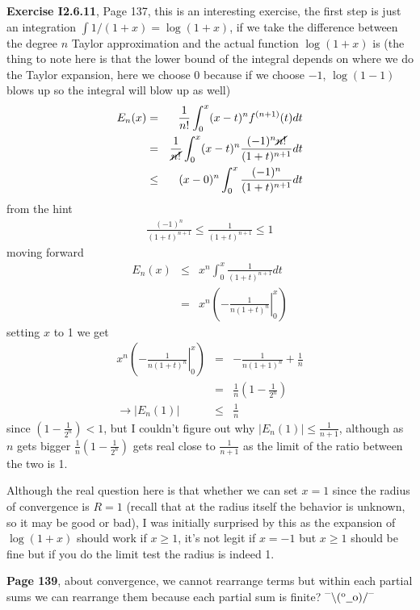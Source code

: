 \documentclass[aps,preprint,preprintnumbers,nofootinbib,showpacs,prd]{revtex4-1}
\newcommand{\nbea}{\begin{eqnarray*}}
\newcommand{\neea}{\end{eqnarray*}}
\newcommand{\dunno}{$ {}^{\mbox {--}}\backslash(^{\rm o}{}\underline{\hspace{0.2cm}}{\rm o})/^{\mbox {--}}$}
\begin{document}
{\bf Exercise I2.6.11}, Page 137, this is an interesting exercise, the first step is just an integration $\int 1/(1+x) = \log(1+x)$, if we take the difference between the degree $n$ Taylor approximation and the actual function $\log(1+x)$ is (the thing to note here is that the lower bound of the integral depends on where we do the Taylor expansion, here we choose 0 because if we choose $-1$, $\log(1-1)$ blows up so the integral will blow up as well)
%
\nbea
E_n(x) & = & \frac{1}{n!} \int_{0}^x(x-t)^nf^{(n+1)}(t) dt \\
& = & \frac{1}{\cancel{n!}} \int_{0}^x(x-t)^n \frac{(-1)^n\cancel{n!}}{(1+t)^{n+1}} dt \\
& \le & (x-0)^n \int_{0}^x \frac{(-1)^n}{(1+t)^{n+1}} dt 
\neea
%
from the hint
%
\nbea
\frac{(-1)^n}{(1+t)^{n+1}} \le \frac{1}{(1+t)^{n+1}} \le 1
\neea
%
moving forward
%
\nbea
E_n(x) & \le & x^n \int_{0}^x \frac{1}{(1+t)^{n+1}} dt \\ 
& = & x^n \left(\left.-\frac{1}{n(1+t)^{n}}\right|_0^x\right)
\neea
%
setting $x$ to 1 we get
%
\nbea
x^n \left(\left.-\frac{1}{n(1+t)^{n}}\right|_0^x\right) & = & -\frac{1}{n(1+1)^{n}} + \frac{1}{n} \\
& = & \frac{1}{n} \left(1 - \frac{1}{2^n}\right) \\
\to |E_n(1)|& \le & \frac{1}{n}
\neea
%
since $\left(1 - \frac{1}{2^n}\right) < 1$, but I couldn't figure out why $|E_n(1)|\le \frac{1}{n+1}$, although as $n$ gets bigger $\frac{1}{n} \left(1 - \frac{1}{2^n}\right)$ gets real close to $\frac{1}{n+1}$ as the limit of the ratio between the two is 1.

Although the real question here is that whether we can set $x=1$ since the radius of convergence is $R=1$ (recall that at the radius itself the behavior is unknown, so it may be good or bad), I was initially surprised by this as the expansion of $\log(1+x)$ should work if $x \ge 1$, it's not legit if $x=-1$ but $x\ge 1$ should be fine but if you do the limit test the radius is indeed 1.

{\bf Page 139}, about convergence, we cannot rearrange terms but within each partial sums we can rearrange them because  each partial sum is finite? \dunno
\end{document}
